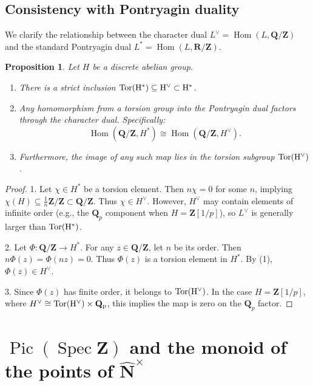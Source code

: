 \documentclass[11pt,a4paper]{article}
\newcommand{\Q}{\mathbf{Q}}
\newcommand{\Z}{\mathbf{Z}}
\newcommand{\R}{\mathbf{R}}
\newcommand{\N}{\mathbf{N}}
\def\N{{\mathbf N}}
\def\nat{\widehat{\N}^\times}
\def\spz{\Spec \Z}
\newcommand{\Spec}{\operatorname{Spec}}
\def\Pic{\operatorname{Pic}}
\def\spz{\Spec \Z}
\theoremstyle{plain}
\newtheorem{prop}[thm]{Proposition}
\theoremstyle{definition} %
\begin{document}
\subsection{Consistency with Pontryagin duality}

We clarify the relationship between the character dual $L^\vee = \operatorname{Hom}(L, \Q/\Z)$ and the standard Pontryagin dual $L^* = \operatorname{Hom}(L, \R/\Z)$.

\begin{prop}\label{dualities}
Let $H$ be a discrete abelian group.
\begin{enumerate}
    \item There is a strict inclusion $\rm{Tor}(H^*) \subseteq H^\vee \subset H^*$.
    \item Any homomorphism from a torsion group into the Pontryagin dual factors through the character dual. Specifically:
    \[
    \operatorname{Hom}(\Q/\Z, H^*) \cong \operatorname{Hom}(\Q/\Z, H^\vee).
    \]
    \item Furthermore, the image of any such map lies in the torsion subgroup $\rm{Tor}(H^\vee)$.
\end{enumerate}
\end{prop}

\begin{proof}
1. Let $\chi \in H^*$ be a torsion element. Then $n\chi = 0$ for some $n$, implying $\chi(H) \subseteq \frac{1}{n}\Z/\Z \subset \Q/\Z$. Thus $\chi \in H^\vee$.
However, $H^\vee$ may contain elements of infinite order (e.g., the $\Q_p$ component when $H=\Z[1/p]$), so $L^\vee$ is generally larger than $\rm{Tor}(H^*)$.

2. Let $\Phi: \Q/\Z \to H^*$. For any $z \in \Q/\Z$, let $n$ be its order. Then $n \Phi(z) = \Phi(nz) = 0$. Thus $\Phi(z)$ is a torsion element in $H^*$. By (1), $\Phi(z) \in H^\vee$.

3. Since $\Phi(z)$ has finite order, it belongs to $\rm{Tor}(H^\vee)$. In the case $H=\Z[1/p]$, where $H^\vee \cong \rm{Tor}(H^\vee) \times \Q_p$, this implies the map is zero on the $\Q_p$ factor.
\end{proof}






\section{$\Pic(\spz)$ and the monoid of the points of $\nat$}\label{appB}
\end{document}
